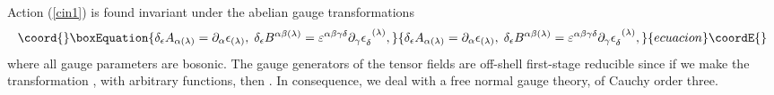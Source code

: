 \documentclass[a4paper,12pt]{article}
\begin{document}
Action (\ref{cin1}) is found invariant under the abelian gauge
transformations
\begin{equation}\coord{}\boxEquation{
\delta _{\epsilon }A_{\alpha (\lambda )}=\partial _{\alpha }\epsilon
_{(\lambda )},\;\delta _{\epsilon }B^{\alpha \beta (\lambda )}=\varepsilon
^{\alpha \beta \gamma \delta }\partial _{\gamma }\epsilon _{\delta
}^{\;\;(\lambda )},  \label{cin2}
}{
\delta _{\epsilon }A_{\alpha (\lambda )}=\partial _{\alpha }\epsilon
_{(\lambda )},\;\delta _{\epsilon }B^{\alpha \beta (\lambda )}=\varepsilon
^{\alpha \beta \gamma \delta }\partial _{\gamma }\epsilon _{\delta
}^{\;\;(\lambda )},  }{ecuacion}\coordE{}\end{equation}
where all gauge parameters are bosonic. The gauge generators of the tensor
fields \coordHE{} are off-shell first-stage reducible
since if we make the transformation \myHighlight{$\epsilon _{\delta }^{\;\;(\lambda
)}=\partial _{\delta }\theta ^{(\lambda )}$}\coordHE{}, with \myHighlight{$\theta ^{(\lambda )}$}\coordHE{}
arbitrary functions, then \coordHE{}%
. In consequence, we deal with a free normal gauge theory, of Cauchy order
three.
\end{document}
